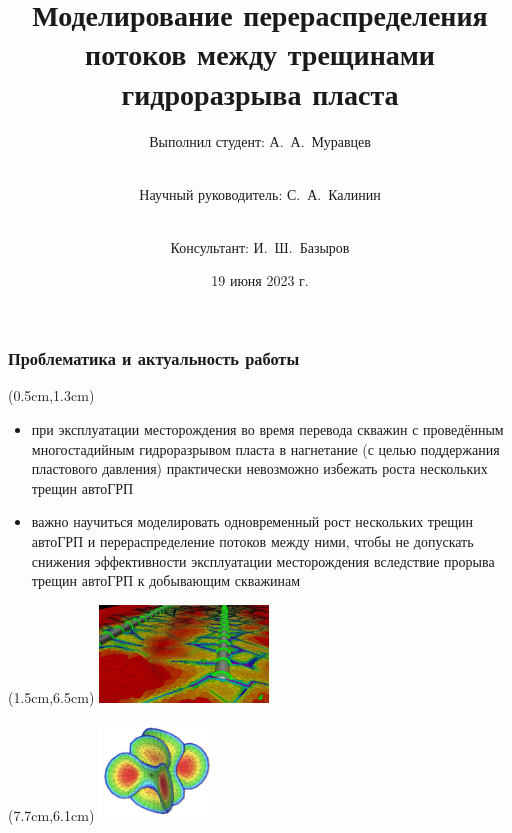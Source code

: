 \documentclass{beamer}
\title{Моделирование перераспределения потоков между трещинами гидроразрыва пласта}
\subtitle{}
\author{Выполнил студент: А.~А.~Муравцев\and \\Научный руководитель: С.~А.~Калинин\and \\Консультант: И.~Ш.~Базыров}
\date{19 июня 2023 г.}
\begin{document}
\begin{frame}
\titlepage
\end{frame}


\begin{frame}
\frametitle{Проблематика и актуальность работы}

\begin{textblock*}{10.5cm}(0.5cm,1.3cm)
\begin{itemize}
	\item при эксплуатации месторождения во время перевода скважин с проведённым многостадийным гидроразрывом пласта в нагнетание (с целью поддержания пластового давления) практически невозможно избежать роста нескольких трещин автоГРП
	\item важно научиться моделировать одновременный рост нескольких трещин автоГРП и перераспределение потоков между ними, чтобы не допускать снижения эффективности эксплуатации месторождения вследствие прорыва трещин автоГРП к добывающим скважинам 
\end{itemize}
\end{textblock*}

\begin{textblock*}{4.5cm}(1.5cm,6.5cm)
\includegraphics[width=4.5cm]{hydraulic_fracturing_abstract_image1.jpeg}
\end{textblock*}

\begin{textblock*}{4cm}(7.7cm,6.1cm)
\includegraphics[width=3cm]{hydraulic_fracturing_abstract_image2.jpg}
\end{textblock*}

\end{frame}
\end{document}
